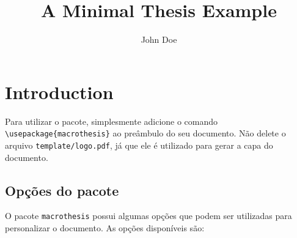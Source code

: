 \documentclass[dissertation,master,firstlang=english,secondlang=brazil]{macrothesis}
\title{A Minimal Thesis Example}
\author{John Doe}
\begin{document}
\maketitlepage
\preamblepage

\chapter{Introduction}
Para utilizar o pacote, simplesmente adicione o comando \texttt{\textbackslash usepackage\{macrothesis\}} ao preâmbulo do seu documento. Não delete o arquivo \texttt{template/logo.pdf}, já que ele é utilizado para gerar a capa do documento. 
\section{Opções do pacote}
O pacote \texttt{macrothesis} possui algumas opções que podem ser utilizadas para personalizar o documento. As opções disponíveis são:
\end{document}
